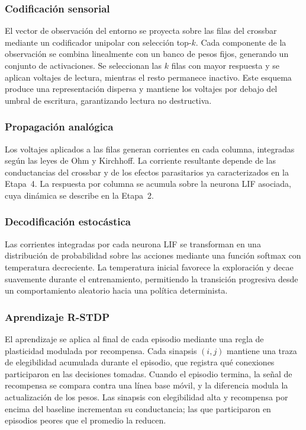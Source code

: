\subsubsection{Codificación sensorial}

El vector de observación del entorno se proyecta sobre las 
filas del crossbar mediante un codificador unipolar con 
selección top-$k$. Cada componente de la observación se 
combina linealmente con un banco de pesos fijos, generando un 
conjunto de activaciones. Se seleccionan las $k$ filas con mayor 
respuesta y se aplican voltajes de lectura, mientras el resto 
permanece inactivo. Este esquema produce una representación 
dispersa y mantiene los voltajes por debajo del umbral de 
escritura, garantizando lectura no destructiva.

\subsubsection{Propagación analógica}

Los voltajes aplicados a las filas generan corrientes en cada 
columna, integradas según las leyes de Ohm y Kirchhoff. La 
corriente resultante depende de las conductancias del crossbar 
y de los efectos parasitarios ya caracterizados en la 
Etapa~4. La respuesta por columna se acumula sobre la 
neurona LIF asociada, cuya dinámica se describe en la 
Etapa~2.

\subsubsection{Decodificación estocástica}

Las corrientes integradas por cada neurona LIF se transforman 
en una distribución de probabilidad sobre las acciones 
mediante una función softmax con temperatura decreciente. La 
temperatura inicial favorece la exploración y decae 
suavemente durante el entrenamiento, permitiendo la transición 
progresiva desde un comportamiento aleatorio hacia una política 
determinista.

\subsubsection{Aprendizaje R-STDP}

El aprendizaje se aplica al final de cada episodio mediante una 
regla de plasticidad modulada por recompensa. Cada sinapsis 
$(i,j)$ mantiene una traza de elegibilidad acumulada durante el 
episodio, que registra qué conexiones participaron en las 
decisiones tomadas. Cuando el episodio termina, la señal de 
recompensa se compara contra una línea base móvil, y la 
diferencia modula la actualización de los pesos. Las sinapsis 
con elegibilidad alta y recompensa por encima del baseline 
incrementan su conductancia; las que participaron en episodios 
peores que el promedio la reducen.

